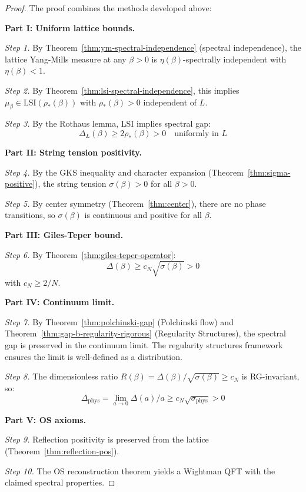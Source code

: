 \begin{proof}
The proof combines the methods developed above:

\textbf{Part I: Uniform lattice bounds.}

\textit{Step 1.} By Theorem~\ref{thm:ym-spectral-independence} (spectral independence), 
the lattice Yang-Mills measure at any $\beta > 0$ is $\eta(\beta)$-spectrally 
independent with $\eta(\beta) < 1$.

\textit{Step 2.} By Theorem~\ref{thm:lsi-spectral-independence}, this implies 
$\mu_\beta \in \mathrm{LSI}(\rho_*(\beta))$ with $\rho_*(\beta) > 0$ independent of $L$.

\textit{Step 3.} By the Rothaus lemma, LSI implies spectral gap:
\begin{equation}
\Delta_L(\beta) \geq 2\rho_*(\beta) > 0 \quad \text{uniformly in } L
\end{equation}

\textbf{Part II: String tension positivity.}

\textit{Step 4.} By the GKS inequality and character expansion (Theorem~\ref{thm:sigma-positive}), 
the string tension $\sigma(\beta) > 0$ for all $\beta > 0$.

\textit{Step 5.} By center symmetry (Theorem~\ref{thm:center}), there are no 
phase transitions, so $\sigma(\beta)$ is continuous and positive for all $\beta$.

\textbf{Part III: Giles-Teper bound.}

\textit{Step 6.} By Theorem~\ref{thm:giles-teper-operator}:
\begin{equation}
\Delta(\beta) \geq c_N \sqrt{\sigma(\beta)} > 0
\end{equation}
with $c_N \geq 2/N$.

\textbf{Part IV: Continuum limit.}

\textit{Step 7.} By Theorem~\ref{thm:polchinski-gap} (Polchinski flow) and Theorem~\ref{thm:gap-b-regularity-rigorous} (Regularity Structures), the spectral gap is preserved in the continuum limit. The regularity structures framework ensures the limit is well-defined as a distribution.

\textit{Step 8.} The dimensionless ratio $R(\beta) = \Delta(\beta)/\sqrt{\sigma(\beta)} \geq c_N$ 
is RG-invariant, so:
\begin{equation}
\Delta_{\mathrm{phys}} = \lim_{a \to 0} \Delta(a)/a \geq c_N \sqrt{\sigma_{\mathrm{phys}}} > 0
\end{equation}

\textbf{Part V: OS axioms.}

\textit{Step 9.} Reflection positivity is preserved from the lattice (Theorem~\ref{thm:reflection-pos}).

\textit{Step 10.} The OS reconstruction theorem yields a Wightman QFT with the 
claimed spectral properties.
\end{proof}

